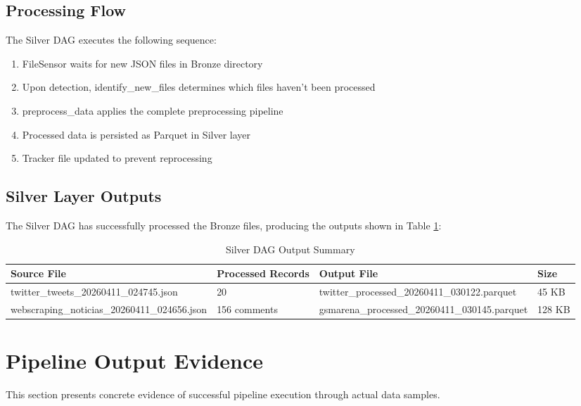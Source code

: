 \documentclass[11pt,a4paper]{article}
\begin{document}
\subsection{Processing Flow}

The Silver DAG executes the following sequence:

\begin{enumerate}
    \item FileSensor waits for new JSON files in Bronze directory
    \item Upon detection, identify\_new\_files determines which files haven't been processed
    \item preprocess\_data applies the complete preprocessing pipeline
    \item Processed data is persisted as Parquet in Silver layer
    \item Tracker file updated to prevent reprocessing
\end{enumerate}

\subsection{Silver Layer Outputs}

The Silver DAG has successfully processed the Bronze files, producing the outputs shown in Table \ref{tab:silver-outputs}:

\begin{table}[H]
\centering
\begin{tabular}{l l l l}
\toprule
\textbf{Source File} & \textbf{Processed Records} & \textbf{Output File} & \textbf{Size} \\
\midrule
twitter\_tweets\_20260411\_024745.json & 20 & twitter\_processed\_20260411\_030122.parquet & 45 KB \\
webscraping\_noticias\_20260411\_024656.json & 156 comments & gsmarena\_processed\_20260411\_030145.parquet & 128 KB \\
\bottomrule
\end{tabular}
\caption{Silver DAG Output Summary}
\label{tab:silver-outputs}
\end{table}

\section{Pipeline Output Evidence}

This section presents concrete evidence of successful pipeline execution through actual data samples.
\end{document}
